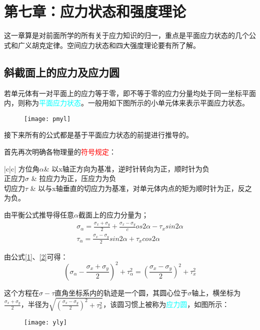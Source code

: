 \documentclass[10pt,a4paper]{ctexart}
\begin{document}
\section{第七章：应力状态和强度理论}
这一章算是对前面所学的所有关于应力知识的归一，重点是平面应力状态的几个公式和广义胡克定律。空间应力状态和四大强度理论要有所了解。

\subsection{斜截面上的应力及应力圆}
若单元体有一对平面上的应力等于零，即不等于零的应力分量均处于同一坐标平面内，则称为\textcolor{cyan}{平面应力状态}。一般用如下图所示的小单元体来表示平面应力状态。
 \begin{figure}[htp]%
 	\centering
 	\texttt{[image: pmyl]}
 \end{figure}

接下来所有的公式都是基于平面应力状态的前提进行推导的。

首先再次明确各物理量的\textcolor{red}{符号规定}：
\begin{table}[h]
	\centering
	\begin{tblr}{|c|c|}%
		\hline
		 方位角$\alpha$& 以x轴正方向为基准，逆时针转向为正，顺时针为负\\
		\hline
		正应力$\sigma$ & 拉应力为正，压应力为负\\
		\hline
		切应力$\tau$	& 以与x轴垂直的切应力为基准，对单元体内点的矩为顺时针为正，反之为负。\\
		\hline
	\end{tblr}
\end{table}

由平衡公式推导得任意$\alpha$截面上的应力分量为；
\begin{gather}
	\sigma_{\alpha}=\frac{\sigma_x+\sigma_y}{2}+\frac{\sigma_x-\sigma_y}cos2\alpha-\tau_xsin2\alpha \label{1}\\
	\tau_{\alpha}=\frac{\sigma_x-\sigma_y}{2}sin2\alpha+\tau_xcos2\alpha \label{2}
\end{gather}

由公式\ref{1}、\ref{2}可得：
\begin{equation}
	\left(\sigma_{\alpha}-\frac{\sigma_x+\sigma_y}{2}\right)^2+\tau_{\alpha}^2=\left(\frac{\sigma_x-\sigma_y}{2}\right)^2+\tau_x^2
\end{equation}

这个方程在$\sigma-\tau$直角坐标系内的轨迹是一个圆，其圆心位于$\sigma$轴上，横坐标为$\frac{\sigma_x+\sigma_y}{2}$，半径为$\sqrt{\left(\frac{\sigma_x-\sigma_y}{2}\right)^2+\tau_x^2}$，该圆习惯上被称为\textcolor{cyan}{应力圆}，如图所示：
 \begin{figure}[htp]%
	\centering
	\texttt{[image: yly]}
\end{figure}
\end{document}
